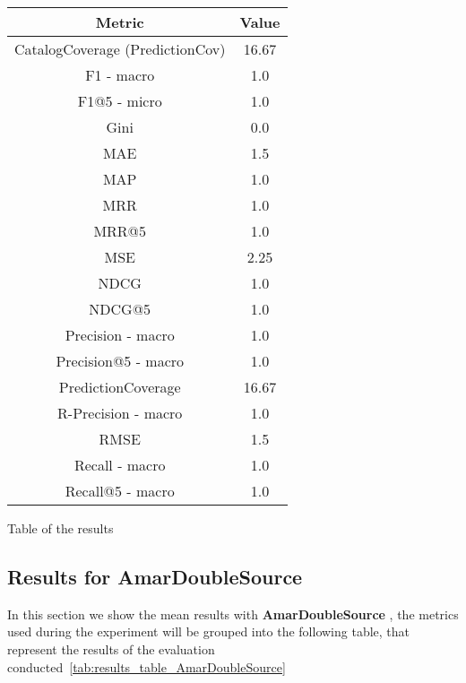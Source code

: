 \documentclass[11pt]{article}
\begin{document}
\begin{center}
    \begin{tabular}{|c|c|}
        \hline
        \textbf{Metric} & \textbf{Value} \\ \hline
                CatalogCoverage (PredictionCov) & 16.67 \\ \hline
                F1 - macro & 1.0 \\ \hline
                F1@5 - micro & 1.0 \\ \hline
                Gini & 0.0 \\ \hline
                MAE & 1.5 \\ \hline
                MAP & 1.0 \\ \hline
                MRR & 1.0 \\ \hline
                MRR@5 & 1.0 \\ \hline
                MSE & 2.25 \\ \hline
                NDCG & 1.0 \\ \hline
                NDCG@5 & 1.0 \\ \hline
                Precision - macro & 1.0 \\ \hline
                Precision@5 - macro & 1.0 \\ \hline
                PredictionCoverage & 16.67 \\ \hline
                R-Precision - macro & 1.0 \\ \hline
                RMSE & 1.5 \\ \hline
                Recall - macro & 1.0 \\ \hline
                Recall@5 - macro & 1.0 \\ \hline
             \end{tabular}
    \captionsetup{type=table}
    \caption{Table of the results}
    \label{tab:results_table_ClassifierRecommender}
\end{center}
\hfill\break
\hfill\break




\subsection{Results for AmarDoubleSource}\label{subsec:AmarDoubleSource}
In this section we show the mean results with \textbf{ AmarDoubleSource }, the metrics used during the experiment will be
grouped into the following table, that represent the results of the evaluation conducted~\ref{tab:results_table_AmarDoubleSource}
\end{document}

